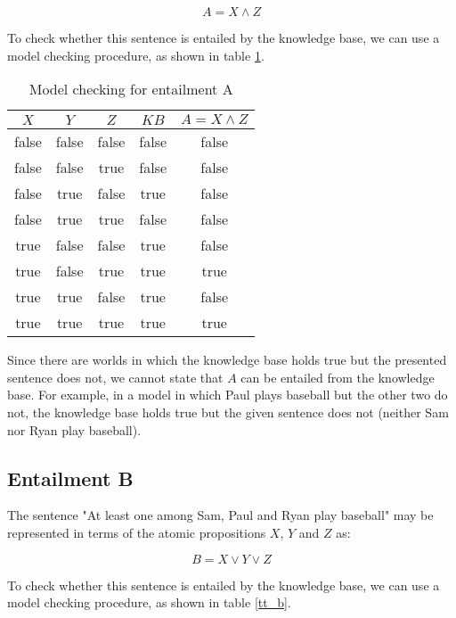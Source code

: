\documentclass[letterpaper,headings=standardclasses]{scrartcl}
\begin{document}
$$ A = X \wedge Z $$

To check whether this sentence is entailed by the knowledge base, we can use a model checking procedure, as shown in table \ref{tt_a}.

\begin{table}[h]
    \centering
    \begin{tabular}{|c|c|c|c|c|}
    \hline
    $X$ & $Y$ & $Z$ & $KB$ & $A = X \wedge Z$ \\ \hline
    false & false & false & false & false \\ \hline
    false & false & true & false & false \\ \hline
    false & true & false & true & false \\ \hline
    false & true & true & false & false \\ \hline
    true & false & false & true & false \\ \hline
    true & false & true & true & true \\ \hline
    true & true & false & true & false \\ \hline
    true & true & true & true & true \\ \hline
    \end{tabular}
    \caption{Model checking for entailment A}
    \label{tt_a}
\end{table}

Since there are worlds in which the knowledge base holds true but the presented sentence does not, we cannot state that $A$ can be entailed from the knowledge base. For example, in a model in which Paul plays baseball but the other two do not, the knowledge base holds true but the given sentence does not (neither Sam nor Ryan play baseball).

\subsection{Entailment B}

The sentence "At least one among Sam, Paul and Ryan play baseball" may be represented in terms of the atomic propositions $X$, $Y$ and $Z$ as:

$$ B = X \vee Y \vee Z $$

To check whether this sentence is entailed by the knowledge base, we can use a model checking procedure, as shown in table \ref{tt_b}.
\end{document}
